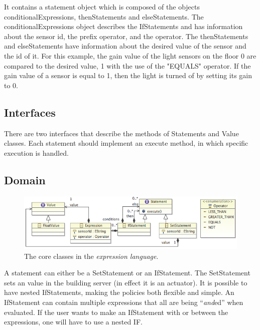 It contains a statement object which is composed of the objects conditionalExpressions, thenStatements and elseStatements. 
The conditionalExpressions object describes the IfStatements and has information about the sensor id, the prefix operator, and the operator. The thenStatements and elseStatements have information about the desired value of the sensor and the id of it. 
For this example, the gain value of the light sensors on the floor 0 are compared to the desired value, 1 with the use of the "EQUALS" operator. If the gain value of a sensor is equal to 1, then the light is turned of by setting its gain to 0. 

\subsection{Interfaces}
There are two interfaces that describe the methods of Statements and Value classes. Each statement should implement an execute method, in which specific execution is handled.
 
\subsection{Domain} \label{s:Domain}

\begin{figure}[ht]
	\centering
    \includegraphics[scale=0.55]{chapters/implementation-model-expression-language.png} 
	\caption{The core classes in the \textit{expression language}.}
	\label{fig:ecore-sensors-actuators}
\end{figure}

A statement can either be a SetStatement or an IfStatement. The SetStatement sets an value in the building server (in effect it is an actuator). It is possible to have nested IfStatements, making the policies both flexible and simple. An IfStatement can contain multiple expressions that all are being ``\textit{and}ed'' when evaluated. If the user wants to make an IfStatement with or between the expressions, one will have to use a nested IF.
 
